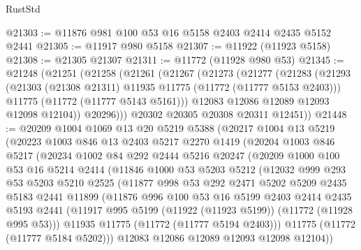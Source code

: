 \begin{lexlean}{RustStd}
\begin{coremodule}
@21303 := @11876 @981 @100 @53 @16 @5158 @2403 @2414 @2435 @5152 @2441
@21305 := @11917 @980 @5158
@21307 := @11922 (@11923 @5158)
@21308 := @21305 @21307
@21311 := @11772 (@11928 @980 @53)
@21345 := @21248
    (@21251
      (@21258
        (@21261
          (@21267
            (@21273
              (@21277
                (@21283
                  (@21293
                    (@21303 (@21308 @21311) @11935 @11775 (@11772 (@11777 @5153 @2403)))
                    @11775
                    (@11772 (@11777 @5143 @5161)))
                  @12083
                  @12086
                  @12089
                  @12093
                  @12098
                  @12104))
              @20296)))
        @20302
        @20305
        @20308
        @20311
        @12451))
@21448 := @20209
    @1004
    @1069
    @13
    @20
    @5219
    @5388
    (@20217
      @1004
      @13
      @5219
      (@20223
        @1003
        @846
        @13
        @2403
        @5217
        @2270
        @1419
        (@20204
          @1003
          @846
          @5217
          (@20234
            @1002
            @84
            @292
            @2444
            @5216
            @20247
            (@20209
              @1000
              @100
              @53
              @16
              @5214
              @2414
              (@11846
                @1000
                @53
                @5203
                @5212
                (@12032
                  @999
                  @293
                  @53
                  @5203
                  @5210
                  @2525
                  (@11877
                    @998
                    @53
                    @292
                    @2471
                    @5202
                    @5209
                    @2435
                    @5183
                    @2441
                    @11899
                    (@11876
                      @996
                      @100
                      @53
                      @16
                      @5199
                      @2403
                      @2414
                      @2435
                      @5193
                      @2441
                      (@11917 @995 @5199 (@11922 (@11923 @5199)) (@11772 (@11928 @995 @53)))
                      @11935
                      @11775
                      (@11772 (@11777 @5194 @2403)))
                    @11775
                    (@11772 (@11777 @5184 @5202)))
                  @12083
                  @12086
                  @12089
                  @12093
                  @12098
                  @12104))

\end{coremodule}
\end{lexlean}
